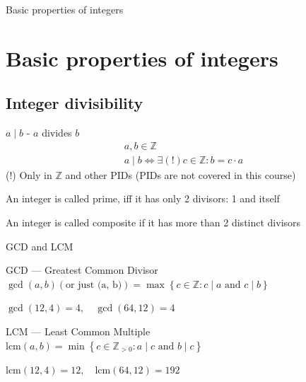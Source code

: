 \documentclass{beamer}
\begin{document}
\begin{frame}{Basic properties of integers}
    \section{Basic properties of integers}
    \subsection{Integer divisibility}
    \begin{definition}
        $a \mid b$ - $a$ divides $b$
        \begin{eqnarray*}
                & a, b \in \mathbb{Z} & \\
                & a \mid b \iff \exists(!) c \in \mathbb{Z} : b = c \cdot a
        \end{eqnarray*}
        (!) Only in $\mathbb{Z}$ and other PIDs (PIDs are not covered in this 
            course) 
    \end{definition}
    \begin{definition}
        An integer is called prime, iff it has only 2 divisors: 1 and itself
    \end{definition}
    \begin{definition}
        An integer is called composite if it has more than 2 distinct divisors
    \end{definition}
\end{frame}

\begin{frame}{GCD and LCM}
    \begin{definition}
        GCD --- Greatest Common Divisor \\
        $\gcd(a, b) (\text{or just (a, b)})= \max \left\{ c \in \mathbb{Z} : c \mid a \text{ and } c \mid b \right\}$
    \end{definition}
    \begin{example}
        $ \gcd(12, 4) = 4, \quad \gcd(64, 12) = 4 $ 
    \end{example}

    \begin{definition}
        LCM --- Least Common Multiple \\
        $\text{lcm}(a, b) = \min \left\{ c \in \mathbb{Z}_{> 0} : a \mid c \text{ and } b \mid c \right\}$
    \end{definition}
    \begin{example}
        $ \text{lcm}(12, 4) = 12, \quad \text{lcm}(64, 12) = 192 $
    \end{example}

\end{frame}
\end{document}
